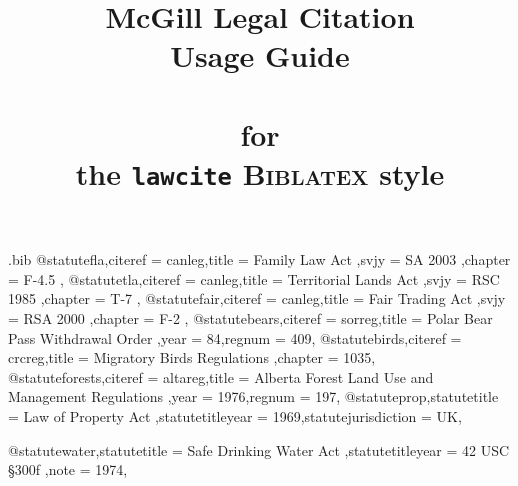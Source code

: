 \begin{filecontents*}{\jobname.bib}
@statute{fla,citeref = {canleg},title = {Family Law Act },svjy = {SA 2003 },chapter = {F-4.5 },}
@statute{tla,citeref = {canleg},title = {Territorial Lands Act },svjy = {RSC 1985 },chapter = {T-7 },}
@statute{fair,citeref = {canleg},title = {Fair Trading Act },svjy = {RSA 2000 },chapter = {F-2 },}
@statute{bears,citeref = {sorreg},title = {Polar Bear Pass Withdrawal Order },year = {84},regnum = {409},}
@statute{birds,citeref = {crcreg},title = {Migratory Birds Regulations },chapter = {1035},}
@statute{forests,citeref = {altareg},title = {Alberta Forest Land Use and Management Regulations },year = {1976},regnum = {197},}
@statute{prop,statutetitle = {Law of Property Act },statutetitleyear = {1969},statutejurisdiction = {UK},}

@statute{water,statutetitle = {Safe Drinking Water Act },statutetitleyear = {42 USC §300f },note = {1974},}




\end{filecontents*}




\documentclass[12pt]{article}
\newcommand\rulesep{\rule{0.4\textwidth}{.4pt}}

\title{McGill Legal Citation\\Usage Guide\\ \ \\{\normalsize for \\ the \texttt{lawcite} \textsc{Biblatex} style}}
\author{}
\date{}
\long\gdef{}
\usepackage[table]{xcolor}
\pagecolor{blue!3}
\usepackage{fontspec}
\setmainfont{Noto Serif}
\setsansfont{TeX Gyre Schola}[Scale=1.2]%
\setmonofont{Noto Sans Mono}%
\usepackage[british]{babel}
\usepackage{csquotes}
\usepackage{graphicx}

\usepackage{marginnote}
\usepackage{abstract}
\usepackage{microtype}

\newcommand\note[1]{(\texttt{#1})}


\newcommand\egcasename{Donoghue v Stevenson}
\newcommand\egcaseref{[1932] AC 562}

\newcommand\eg[1]{%
(\texttt{#1})
}

\newcommand\numeg{\refstepcounter{examplecounter}\marginpar{Ex \theexamplecounter\label{ex\theexamplecounter}}}

